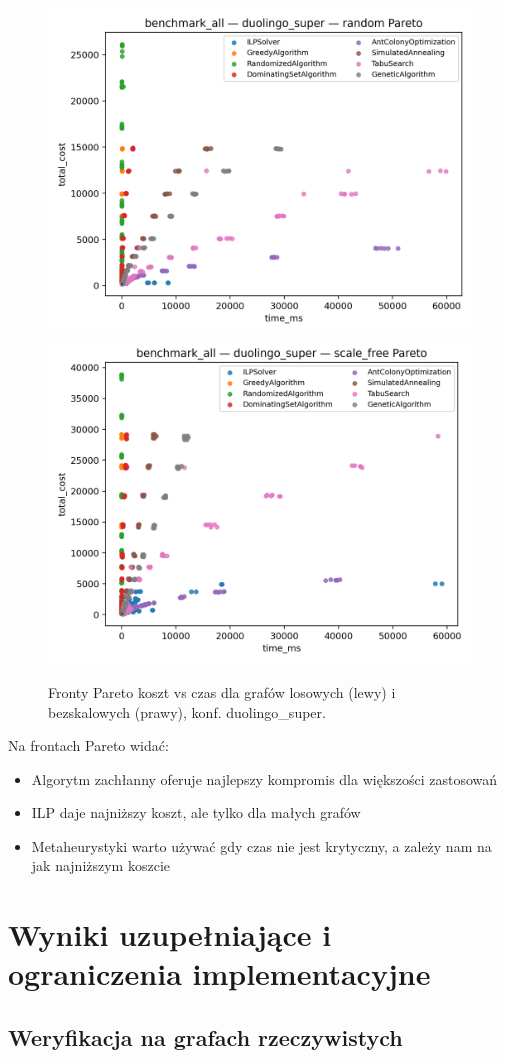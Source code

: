 \begin{figure}[H]
  \centering
  \includegraphics[width=0.48\linewidth]{assets/figures/ba_random_duo_pareto.png}
  \includegraphics[width=0.48\linewidth]{assets/figures/ba_scale_free_duo_pareto.png}
  \caption{Fronty Pareto koszt vs czas dla grafów losowych (lewy) i bezskalowych (prawy), konf. duolingo\_super.}
  \label{fig:pareto_analysis}
\end{figure}

Na frontach Pareto widać:
\begin{itemize}
  \item Algorytm zachłanny oferuje najlepszy kompromis dla większości zastosowań
  \item ILP daje najniższy koszt, ale tylko dla małych grafów
  \item Metaheurystyki warto używać gdy czas nie jest krytyczny, a zależy nam na jak najniższym koszcie
\end{itemize}

\section{Wyniki uzupełniające i ograniczenia implementacyjne}

\subsection{Weryfikacja na grafach rzeczywistych}

